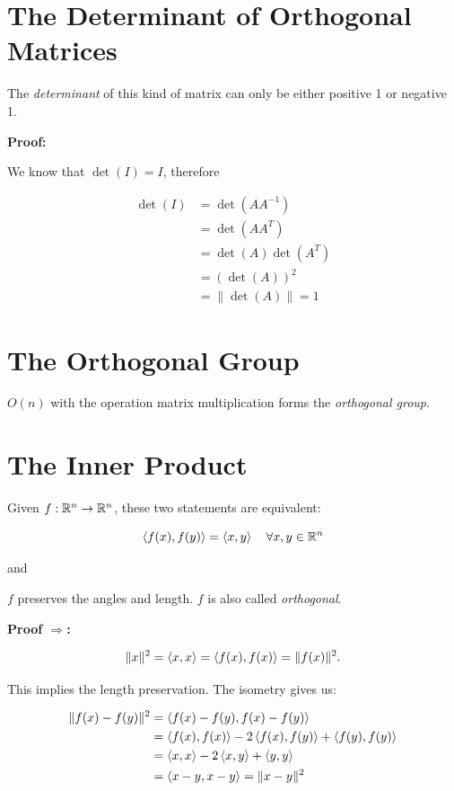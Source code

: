 \QED

\section{The Determinant of Orthogonal Matrices}

The \emph{determinant} of this kind of matrix can only be either positive 1 or negative 1.

\textbf{Proof:}

We know that \(\det(I) = I \), therefore

\begin{align*}
    \det(I) &= \det(A A^{-1}) \\
            &= \det(A A^T) \\
            &= \det(A) \det(A^T) \\
            &= (\det(A))^2 \\
            &= \|\det (A) \| = 1
\end{align*}

\QED

\section{The Orthogonal Group}

\(O(n)\) with the operation matrix multiplication forms the \emph{orthogonal group}.

\section{The Inner Product}

Given \(f: \mathbb{R}^n \to \mathbb{R}^n\), these two statements are equivalent:

\[
    \left\langle f(x), f(y)\right\rangle = \left\langle x, y\right\rangle \quad \forall x,y \in \mathbb{R}^n
\]

and 

\(f\) preserves the angles and length. \(f\) is also called \emph{orthogonal}.

\textbf{Proof \(\Rightarrow\):}
 
\[
    \|x\|^2 = \left\langle x, x\right\rangle = \left\langle f(x), f(x)\right\rangle = \|f(x)\|^2.
\]

This implies the length preservation. The isometry gives us:

\begin{align*}
    \|f(x) - f(y)\|^2 
    &= \left\langle f(x) - f(y), f(x) - f(y)\right\rangle \\
    &= \left\langle f(x), f(x)\right\rangle - 2\left\langle f(x), f(y)\right\rangle + \left\langle f(y), f(y)\right\rangle \\
    &= \left\langle x, x\right\rangle - 2\left\langle x, y\right\rangle + \left\langle y, y\right\rangle \\
    &= \left\langle x - y, x - y\right\rangle = \|x - y\|^2
\end{align*}


